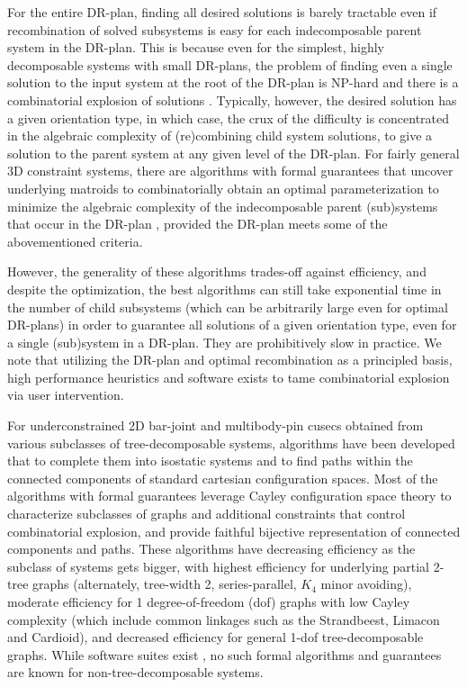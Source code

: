 \medskip\noindent{}
For the entire DR-plan, finding all
desired solutions is barely tractable even if recombination
of solved subsystems is easy for each indecomposable parent system in the
DR-plan.
This is because even for the simplest, highly decomposable systems
with small DR-plans, the problem of finding even a single
solution to the input system at the root of the DR-plan
is NP-hard \cite{XX} and there is a
combinatorial explosion of solutions \cite{XX}. Typically, however,
the desired solution has a given orientation type, in which case,
the crux of the difficulty is concentrated in the algebraic complexity of
(re)combining child system solutions, to give a
solution to the parent system at any
given level of the DR-plan.
For fairly general 3D constraint systems,
there are algorithms with formal
guarantees that uncover underlying matroids to combinatorially
obtain an optimal parameterization to minimize the algebraic
complexity of the indecomposable parent (sub)systems that occur in the
DR-plan \cite{XX, XX,XX},
provided the DR-plan meets some of the abovementioned criteria.

However, the generality of these algorithms
trades-off against efficiency, and despite the optimization,
the best algorithms can still take
exponential time in the number of child subsystems (which can be arbitrarily
large even for optimal DR-plans) in order to guarantee
all solutions of a given orientation type,
even for a single (sub)system in a DR-plan. They
are prohibitively slow in practice. We note that utilizing the DR-plan and
optimal recombination as a principled basis, high performance heuristics
and software
exists \cite{XX,XX} to
tame combinatorial explosion via user intervention.


\medskip\noindent{}
For underconstrained 2D bar-joint and multibody-pin cusecs obtained from
various subclasses of tree-decomposable systems, algorithms have been
developed \cite{XX, XX} that
to complete them into isostatic systems \cite{XX, XX} and to find paths
within the connected components \cite{XX,XX} of
standard cartesian configuration spaces. Most of the algorithms with
formal guarantees leverage Cayley configuration space theory \cite{XX,XX}
to characterize subclasses of graphs and additional constraints that
control combinatorial explosion, and provide faithful bijective
representation
of connected components and paths.
These algorithms have decreasing efficiency as the subclass of systems
gets bigger,  with highest efficiency for
underlying partial 2-tree graphs (alternately, tree-width 2,
series-parallel, $K_4$ minor avoiding),   moderate efficiency for
1 degree-of-freedom (dof) graphs with low Cayley complexity (which include
common linkages such as the Strandbeest, Limacon and Cardioid), and
decreased efficiency for general 1-dof tree-decomposable graphs. While
software suites exist \cite{XX,XX}, no such formal algorithms and
guarantees are known for non-tree-decomposable systems.
%
